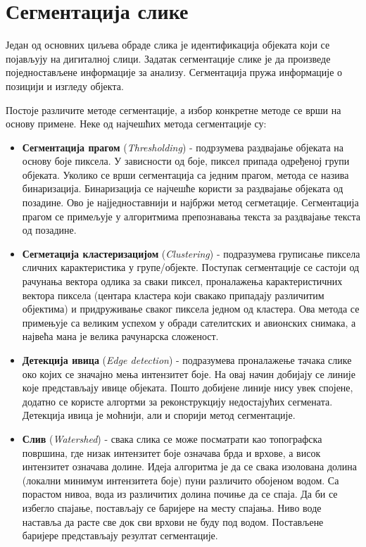 \documentclass[11pt,a4paper,serbian,oneside]{book}
\begin{document}
\newpage

\section{Сегментација слике}

Један од основних циљева обраде слика је идентификација објеката који се појављују на дигиталној слици. Задатак сегментације слике је да произведе поједностављене ин\-фор\-ма\-ци\-је за анализу. Сегментација пружа информације о позицији и изгледу објекта.

Постоје различите методе сегментације, а избор конкретне методе се врши на основу примене. Неке од најчешћих метода сегментације су:

\begin{itemize}

  \item \textbf{Сегментација прагом} (\textit{Thresholding}) - подрзумева раздвајање објеката на основу боје пиксела. У зависности од боје, пиксел припада одређеној групи објеката. Уколико се врши сегментација са једним прагом, метода се назива бинаризација. Бинаризација се најчешће користи за раздвајање објеката од позадине. Ово је најједноставнији и најбржи метод сегметације. Сегментација прагом се примељује у алгоритмима препознавања текста за раздвајање текста од позадине.

  \item \textbf{Сегметација кластеризацијом} (\textit{Clustering}) - подразумева груписање пиксела слич\-них карактеристика у групе/објекте. Поступак сегментације се састоји од рачунања вектора одлика за сваки пиксел, проналажења карактеристичних вектора пиксела (центара кластера који свакако припадају различитим објектима) и придруживање сваког пиксела једном од кластера. Ова метода се примењује са великим успехом у обради сателитских и авионских снимака, а највећа мана је велика рачунарска сложеност.
  
  \item \textbf{Детекција ивица} (\textit{Edge detection}) - подразумева проналажење тачака слике око којих се значајно мења интензитет боје. На овај начин добијају се линије које представљају ивице објеката. Пошто добијене линије нису увек спојене, додатно се користе алгортми за реконструкцију недостајућих сегмената. Детекција ивица је моћнији, али и спорији метод сегментације.
  
  \item \textbf{Слив} (\textit{Watershed}) - свака слика се може посматрати као топографска површина, где низак интензитет боје означава брда и врхове, а висок интензитет означава долине. Идеја алгоритма је да се свака изолована долина  (локални минимум интензитета боје) пуни различито обојеном водом. Са порастом нивоа, вода из различитих долина почиње да се спаја. Да би се избегло спајање, постављају се баријере на месту спајања.  Ниво воде наставља да расте све док сви врхови не буду под водом. Постављене баријере представљају резултат сегментације.

\end{itemize}
 
\end{document}
